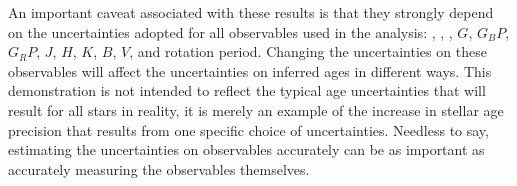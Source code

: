 An important caveat associated with these results is that they strongly depend
on the uncertainties adopted for all observables used in the analysis: \teff,
\feh, \logg, $G$, $G_BP$, $G_RP$, $J$, $H$, $K$, $B$, $V$, and rotation
period.
Changing the uncertainties on these observables will affect the uncertainties
on inferred ages in different ways.
This demonstration is not intended to reflect the typical age uncertainties
that will result for all stars in reality, it is merely an example of the
increase in stellar age precision that results from one specific choice of
uncertainties.
Needless to say, estimating the uncertainties on observables accurately can be
as important as accurately measuring the observables themselves.


